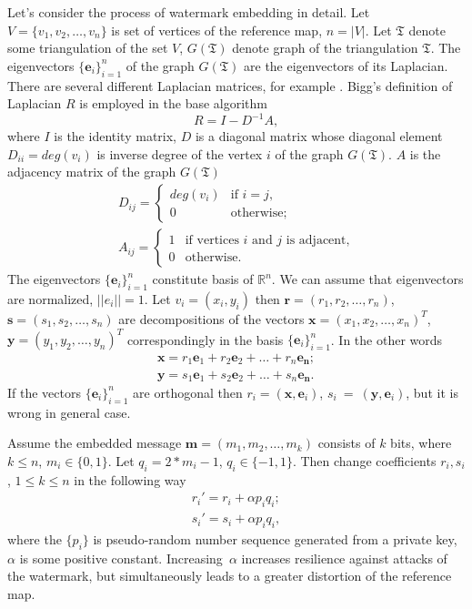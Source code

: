 \documentclass{article}
\begin{document}
Let's consider the process of watermark embedding in detail. Let $V = \{v_1, v_2, \dots, v_n\}$ is set of vertices of the reference map, $n = |V|$. Let $\mathfrak{T}$ denote some triangulation of the set $V$, 
$G(\mathfrak{T})$ denote graph of the triangulation $\mathfrak{T}$. The eigenvectors $\{\mathbf{e}_i\}_{i=1}^n$ of the graph $G(\mathfrak{T})$ are the eigenvectors of its Laplacian. 
There are several different Laplacian matrices, for example \cite{Biggs, Chung, Zhang}. Bigg's definition of Laplacian $R$ is employed in the base algorithm
$$R = I - D^{-1} A,$$ where $I$ is the identity matrix, $D$ is a diagonal matrix whose diagonal element $D_{ii} = deg(v_i)$ is inverse degree of the vertex $i$ of the graph $G(\mathfrak{T})$. 
$A$ is the adjacency matrix of the graph $G(\mathfrak{T})$
\begin{eqnarray*}
  D_{ij} = \begin{cases} deg(v_i) &\text{if $i = j$,} \\ 0 &\text{otherwise;} \end{cases} \\
  A_{ij} = \begin{cases} 1 &\text{if vertices $i$ and $j$ is adjacent,} \\ 0 &\text{otherwise.} \end{cases} 
\end{eqnarray*}
The eigenvectors $\{\mathbf{e}_i\}_{i=1}^n$ constitute basis of $\mathbb{R}^n$. We can assume that eigenvectors are normalized, $||e_i|| = 1$. 
Let $v_i = (x_i, y_i)$ then $\mathbf{r} = (r_1, r_2, \dots, r_n)$, $\mathbf{s} = (s_1, s_2, \dots, s_n)$ are decompositions of the vectors $\mathbf{x} = (x_1, x_2, \dots, x_n)^T$, 
$\mathbf{y} = (y_1, y_2, \dots, y_n)^T$ correspondingly in the basis $\{\mathbf{e}_i\}_{i=1}^n$. In the other words 
\begin{eqnarray*}
  \mathbf{x} = r_1 \mathbf{e}_1 + r_2 \mathbf{e}_2 + \dots + r_n \mathbf{e_n}; \\ 
  \mathbf{y} = s_1 \mathbf{e}_1 + s_2 \mathbf{e}_2 + \dots + s_n \mathbf{e_n}.  
\end{eqnarray*}
If the vectors $\{\mathbf{e}_i\}_{i=1}^n$ are orthogonal then $r_i = (\mathbf{x}, \mathbf{e}_i)$, $s_i~=~(\mathbf{y}, \mathbf{e}_i)$, but it is wrong in general case. 

Assume the embedded message $\mathbf{m} = (m_1, m_2, \dots, m_k)$ consists of $k$ bits, where $k \le n$, $m_i \in \{0, 1\}$. Let $q_i = 2 * m_i - 1$, $q_i \in \{-1, 1\}$.
Then change coefficients $r_i, s_i$, $1 \le k \le n$ in the following way
\begin{eqnarray*}
  r_i' = r_i + \alpha p_i q_i; \\
  s_i' = s_i + \alpha p_i q_i, 
\end{eqnarray*}
where the $\{p_i\}$ is pseudo-random number sequence generated from a private key, $\alpha$ is some positive constant. Increasing~$\alpha$ increases resilience against attacks of the watermark, 
but simultaneously leads to a greater distortion of the reference map. 
\end{document}
